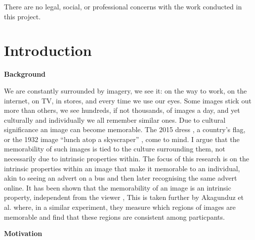 \documentclass{UoYCSproject}
\begin{document}
There are no legal, social, or professional concerns with the work conducted in this project.

\chapter{Introduction}


\textbf{Background}

We are constantly surrounded by imagery, we see it: on the way to work, on the internet, on TV, in stores, and every time we use our eyes. Some images stick out more than others, we see hundreds, if not thousands, of images a day, and yet culturally and individually we all remember similar ones. Due to cultural significance an image can become memorable. The 2015 dress \cite{BBCDress2015}, a country's flag, or the 1932 image “lunch atop a skyscraper” \cite{gambino_2012}, come to mind. I argue that the memorability of such images is tied to the culture surrounding them, not necessarily due to intrinsic properties within. The focus of this research is on the intrinsic properties within an image that make it memorable to an individual, akin to seeing an advert on a bus and then later recognising the same advert online.
It has been shown that the memorability of an image is an intrinsic property, independent from the viewer \cite{Isola2011, IsolaParikhTorralbaOliva2011, ICCV15_Khosla, isola2014memorability}, This is taken further by Akagunduz et al. \cite{VischemaPaper} where, in a similar experiment, they measure which regions of images are memorable and find that these regions are consistent among particpants.

\textbf{Motivation}

\end{document}
